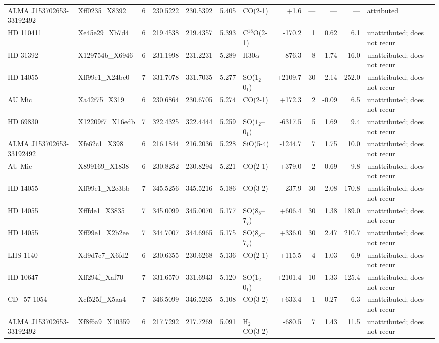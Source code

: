 \begin{tabular}{@{}l@{~}l@{~}c@{~}r@{~}r@{~}r@{~}l@{~}r@{~~}r@{~}r@{~}r@{~}l@{}}
ALMA J153702653-33192492 & Xff0235\_X8392 & 6 & 230.5222 & 230.5392 & 5.405 & CO(2-1) & +1.6 & --- & --- & --- & attributed \\
HD 110411 & Xe45e29\_Xb7d4 & 6 & 219.4538 & 219.4357 & 5.393 & C$^{18}$O(2-1) & -170.2 & 1 & 0.62 & 6.1 & unattributed; does not recur \\
HD 31392 & X129754b\_X6946 & 6 & 231.1998 & 231.2231 & 5.289 & H30$\alpha$ & -876.3 & 8 & 1.74 & 16.0 & unattributed; does not recur \\
HD 14055 & Xff99e1\_X24be0 & 7 & 331.7078 & 331.7035 & 5.277 & SO($1_2$--$0_1$) & +2109.7 & 30 & 2.14 & 252.0 & unattributed; does not recur \\
AU Mic & Xa42f75\_X319 & 6 & 230.6864 & 230.6705 & 5.274 & CO(2-1) & +172.3 & 2 & -0.09 & 6.5 & unattributed; does not recur \\
HD 69830 & X12209f7\_X16edb & 7 & 322.4325 & 322.4444 & 5.259 & SO($1_2$--$0_1$) & -6317.5 & 5 & 1.69 & 9.4 & unattributed; does not recur \\
ALMA J153702653-33192492 & Xfe62c1\_X398 & 6 & 216.1844 & 216.2036 & 5.228 & SiO(5-4) & -1244.7 & 7 & 1.75 & 10.0 & unattributed; does not recur \\
AU Mic & X899169\_X1838 & 6 & 230.8252 & 230.8294 & 5.221 & CO(2-1) & +379.0 & 2 & 0.69 & 9.8 & unattributed; does not recur \\
HD 14055 & Xff99e1\_X2c3bb & 7 & 345.5256 & 345.5216 & 5.186 & CO(3-2) & -237.9 & 30 & 2.08 & 170.8 & unattributed; does not recur \\
HD 14055 & Xfffde1\_X3835 & 7 & 345.0099 & 345.0070 & 5.177 & SO($8_8$--$7_7$) & +606.4 & 30 & 1.38 & 189.0 & unattributed; does not recur \\
HD 14055 & Xff99e1\_X2b2ee & 7 & 344.7007 & 344.6965 & 5.175 & SO($8_8$--$7_7$) & +336.0 & 30 & 2.47 & 210.7 & unattributed; does not recur \\
LHS 1140 & Xd9d7c7\_X6fd2 & 6 & 230.6355 & 230.6268 & 5.136 & CO(2-1) & +115.5 & 4 & 1.03 & 6.9 & unattributed; does not recur \\
HD 10647 & Xff294f\_Xaf70 & 7 & 331.6570 & 331.6943 & 5.120 & SO($1_2$--$0_1$) & +2101.4 & 10 & 1.33 & 125.4 & unattributed; does not recur \\
CD$-$57 1054 & Xcf525f\_X5aa4 & 7 & 346.5099 & 346.5265 & 5.108 & CO(3-2) & +633.4 & 1 & -0.27 & 6.3 & unattributed; does not recur \\
ALMA J153702653-33192492 & Xf8f6a9\_X10359 & 6 & 217.7292 & 217.7269 & 5.091 & H$_2$CO(3-2) & -680.5 & 7 & 1.43 & 11.5 & unattributed; does not recur \\

\end{tabular}
